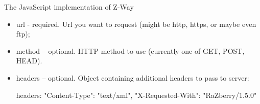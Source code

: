 The JavaScript implementation of Z-Way 
\begin{itemize}
\item url - required. Url you want to request (might be http, https, or maybe even ftp);
\item method – optional. HTTP method to use (currently one of GET, POST, HEAD). 
\item headers – optional. Object containing additional headers to pass to server:

\begin{listingverbatim}
headers: {
    "Content-Type": "text/xml",
    "X-Requested-With": "RaZberry/1.5.0"
}
\end{listingverbatim}


\end{itemize}
